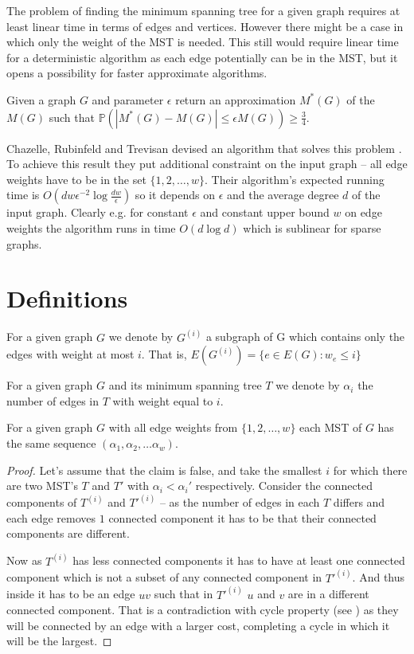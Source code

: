 The problem of finding the minimum spanning tree for a given graph requires at least linear time in terms of edges and vertices. However there might be a case in which only the weight of the MST is needed. This still would require linear time for a deterministic algorithm as each edge potentially can be in the MST, but it opens a possibility for faster approximate algorithms. 

\begin{problem}
    Given a graph $G$ and parameter $\epsilon$ return an approximation $M^*(G)$ of the $M(G)$ such that $\mathbb{P}(|M^*(G) - M(G)| \leq \epsilon M(G)) \geq \frac34$.
\label{mstapprox}
\end{problem}

Chazelle, Rubinfeld and Trevisan devised an algorithm that solves this problem \cite{crt}. To achieve this result they put additional constraint on the input graph -- all edge weights have to be in the set $\{1, 2,\dots, w\}$. Their algorithm's expected running time is $O(dw\epsilon^{-2}\log{\frac{dw}\epsilon})$ so it depends on $\epsilon$ and the average degree $d$ of the input graph. Clearly e.g. for constant $\epsilon$ and constant upper bound $w$ on edge weights the algorithm runs in time $O(d\log{d})$ which is sublinear for sparse graphs.

\section{Definitions}
\begin{definition}
     For a given graph $G$ we denote by $G^{(i)}$ a subgraph of G which contains only the edges with weight at most $i$. That is, $E(G^{(i)}) = \{e \in E(G): w_e \leq i\}$ 
\end{definition}
\begin{definition}
For a given graph $G$ and its minimum spanning tree $T$ we denote by $\alpha_i$ the number of edges in $T$ with weight equal to $i$.
\end{definition}
\begin{lemma}
For a given graph $G$ with all edge weights from $\{1, 2, \ldots, w\}$ each MST of $G$ has the same sequence $(\alpha_1, \alpha_2, \ldots\alpha_w)$.
\label{alfas}
\end{lemma}
\begin{proof}
    Let's assume that the claim is false, and take the smallest $i$ for which there are two MST's $T$ and $T'$ with $\alpha_i < \alpha_i'$ respectively. Consider the connected components of $T^{(i)}$ and $T'^{(i)}$ -- as the number of edges in each $T$ differs and each edge removes $1$ connected component it has to be that their connected components are different. 

    Now as $T^{(i)}$ has less connected components it has to have at least one connected component which is not a subset of any connected component in $T'^{(i)}$. And thus inside it has to be an edge $uv$ such that in $T'^{(i)}$ $u$ and $v$ are in a different connected component. That is a contradiction with cycle property (see ) as they will be connected by an edge with a larger cost, completing a cycle in which it will be the largest.
\end{proof}
